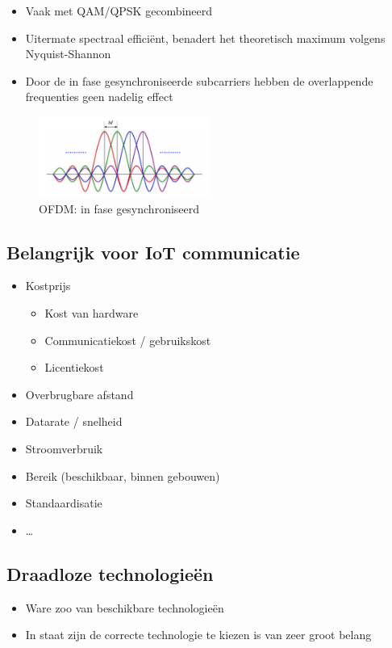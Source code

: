 \documentclass{article}
\begin{document}
\begin{itemize}
    \item Vaak met QAM/QPSK gecombineerd
    \item Uitermate spectraal efficiënt, benadert het theoretisch maximum volgens Nyquist-Shannon
    \item Door de in fase gesynchroniseerde subcarriers hebben de overlappende frequenties geen nadelig effect
\end{itemize}

\begin{figure}[H]
    \centering
    \includegraphics[width=0.5\textwidth]{ofdm3.png} 
    \caption{OFDM: in fase gesynchroniseerd}
\end{figure}

\subsection{Belangrijk voor IoT communicatie}

\begin{itemize}
    \item Kostprijs
    \begin{itemize}
        \item Kost van hardware
        \item Communicatiekost / gebruikskost
        \item Licentiekost
    \end{itemize}
    \item Overbrugbare afstand
    \item Datarate / snelheid
    \item Stroomverbruik
    \item Bereik (beschikbaar, binnen gebouwen)
    \item Standaardisatie
    \item \dots
\end{itemize}

\subsection{Draadloze technologieën}
\begin{itemize}
    \item Ware zoo van beschikbare technologieën
    \item In staat zijn de correcte technologie te kiezen is van zeer groot belang
\end{itemize}
\end{document}
